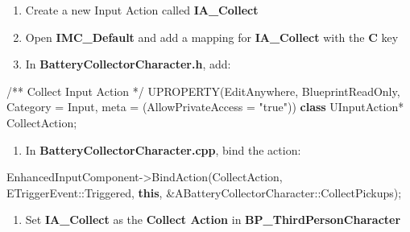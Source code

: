 \documentclass[
  letterpaper,
  DIV=11,
  numbers=noendperiod]{scrartcl}
\newenvironment{Shaded}{\begin{snugshade}}{\end{snugshade}}
\newcommand{\CommentTok}[1]{\textcolor[rgb]{0.37,0.37,0.37}{#1}}
\newcommand{\KeywordTok}[1]{\textcolor[rgb]{0.00,0.23,0.31}{\textbf{#1}}}
\newcommand{\NormalTok}[1]{\textcolor[rgb]{0.00,0.23,0.31}{#1}}
\newcommand{\OperatorTok}[1]{\textcolor[rgb]{0.37,0.37,0.37}{#1}}
\newcommand{\StringTok}[1]{\textcolor[rgb]{0.13,0.47,0.30}{#1}}
\providecommand{\tightlist}{%
  \setlength{\itemsep}{0pt}\setlength{\parskip}{0pt}}
\begin{document}
\begin{enumerate}
\def\labelenumi{\arabic{enumi}.}
\tightlist
\item
  Create a new Input Action called \textbf{IA\_Collect}
\item
  Open \textbf{IMC\_Default} and add a mapping for \textbf{IA\_Collect}
  with the \textbf{C} key
\item
  In \textbf{BatteryCollectorCharacter.h}, add:
\end{enumerate}

\begin{Shaded}
\begin{Highlighting}[]
\CommentTok{/** Collect Input Action */}
\NormalTok{UPROPERTY}\OperatorTok{(}\NormalTok{EditAnywhere}\OperatorTok{,}\NormalTok{ BlueprintReadOnly}\OperatorTok{,}\NormalTok{ Category }\OperatorTok{=}\NormalTok{ Input}\OperatorTok{,}\NormalTok{ meta }\OperatorTok{=} \OperatorTok{(}\NormalTok{AllowPrivateAccess }\OperatorTok{=} \StringTok{"true"}\OperatorTok{))}
\KeywordTok{class}\NormalTok{ UInputAction}\OperatorTok{*}\NormalTok{ CollectAction}\OperatorTok{;}
\end{Highlighting}
\end{Shaded}

\begin{enumerate}
\def\labelenumi{\arabic{enumi}.}
\setcounter{enumi}{3}
\tightlist
\item
  In \textbf{BatteryCollectorCharacter.cpp}, bind the action:
\end{enumerate}

\begin{Shaded}
\begin{Highlighting}[]
\NormalTok{EnhancedInputComponent}\OperatorTok{{-}\textgreater{}}\NormalTok{BindAction}\OperatorTok{(}\NormalTok{CollectAction}\OperatorTok{,}\NormalTok{ ETriggerEvent}\OperatorTok{::}\NormalTok{Triggered}\OperatorTok{,} \KeywordTok{this}\OperatorTok{,} \OperatorTok{\&}\NormalTok{ABatteryCollectorCharacter}\OperatorTok{::}\NormalTok{CollectPickups}\OperatorTok{);}
\end{Highlighting}
\end{Shaded}

\begin{enumerate}
\def\labelenumi{\arabic{enumi}.}
\setcounter{enumi}{4}
\tightlist
\item
  Set \textbf{IA\_Collect} as the \textbf{Collect Action} in
  \textbf{BP\_ThirdPersonCharacter}
\end{enumerate}
\end{document}
